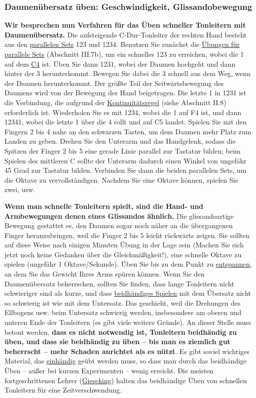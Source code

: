 
\label{c1iii5a2}
\subsubsection{Daumenübersatz üben: Geschwindigkeit, Glissandobewegung}
\label{c1iii5c}

\textbf{Wir besprechen nun Verfahren für das Üben schneller Tonleitern mit Daumenübersatz.}
Die aufsteigende C-Dur-Tonleiter der rechten Hand besteht aus den \hyperref[c1iv2]{parallelen Sets} 123 und 1234.
Benutzen Sie zunächst die \hyperref[c1iii7b]{Übungen für parallele Sets} (Abschnitt III.7b), um ein schnelles 123 zu erreichen, wobei die 1 auf dem \hyperref[Noten]{C4} ist.
Üben Sie dann 1231, wobei der Daumen hochgeht und dann hinter der 3 herunterkommt.
Bewegen Sie dabei die 3 schnell aus dem Weg, wenn der Daumen herunterkommt.
Der größte Teil der Seitwärtsbewegung des Daumens wird von der Bewegung der Hand beigetragen.
Die letzte 1 in 1231 ist die Verbindung, die aufgrund der \hyperref[c1ii8]{Kontinuitätsregel} (siehe Abschnitt II.8) erforderlich ist.
Wiederholen Sie es mit 1234, wobei die 1 auf F4 ist, und dann 12341, wobei die letzte 1 über die 4 rollt und auf C5 landet.
Spielen Sie mit den Fingern 2 bis 4 nahe an den schwarzen Tasten, um dem Daumen mehr Platz zum Landen zu geben.
Drehen Sie den Unterarm und das Handgelenk, sodass die Spitzen der Finger 2 bis 5 eine gerade Linie parallel zur Tastatur bilden; beim Spielen des mittleren C sollte der Unterarm dadurch einen Winkel von ungefähr 45 Grad zur Tastatur bilden.
Verbinden Sie dann die beiden parallelen Sets, um die Oktave zu vervollständigen.
Nachdem Sie eine Oktave können, spielen Sie zwei, usw.

\textbf{Wenn man schnelle Tonleitern spielt, sind die Hand- und Armbewegungen denen eines Glissandos ähnlich.}
Die glissandoartige Bewegung gestattet es, den Daumen sogar noch näher an die übergangenen Finger heranzubringen, weil die Finger 2 bis 5 leicht rückwärts zeigen.
Sie sollten auf diese Weise nach einigen Minuten Übung in der Lage sein (Machen Sie sich jetzt noch keine Gedanken über die Gleichmäßigkeit!), eine schnelle Oktave zu spielen (ungefähr 1 Oktave/Sekunde).
Üben Sie bis zu dem Punkt zu \hyperref[c1ii14]{entspannen}, an dem Sie das Gewicht Ihres Arms spüren können.
Wenn Sie den Daumenübersatz beherrschen, sollten Sie finden, dass lange Tonleitern nicht schwieriger sind als kurze, und dass \hyperref[c1ii25]{beidhändiges Spielen} mit dem Übersatz nicht so schwierig ist wie mit dem Untersatz.
Das geschieht, weil die Drehungen des Ellbogens usw. beim Untersatz schwierig werden, insbesondere am oberen und unteren Ende der Tonleitern (es gibt viele weitere Gründe).
An dieser Stelle muss betont werden, \textbf{dass es nicht notwendig ist, Tonleitern beidhändig zu üben, und dass sie beidhändig zu üben -- bis man es ziemlich gut beherrscht -- mehr Schaden anrichtet als es nützt}.
Es gibt soviel wichtiges Material, das \hyperref[c1ii7]{einhändig} geübt werden muss, so dass man durch das beidhändige Üben -- außer bei kurzen Experimenten -- wenig erreicht.
Die meisten fortgeschrittenen Lehrer (\hyperref[Gieseking]{Gieseking}) halten das beidhändige Üben von schnellen Tonleitern für eine Zeitverschwendung.

